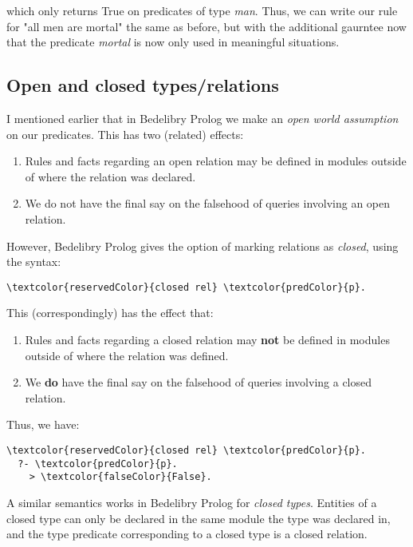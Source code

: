 \documentclass{book}
\begin{document}
which only returns True on predicates of type \textit{man}. Thus, we can write our rule for "all men are mortal" the same as before, but with the additional gaurntee now that the predicate \textit{mortal} is now only used in meaningful situations.

\subsection{Open and closed types/relations}

I mentioned earlier that in Bedelibry Prolog we make an \textit{open world assumption} on our predicates. This has two (related) effects:

\begin{enumerate}
  \item Rules and facts regarding an open relation may be defined in modules outside of where the relation was declared.
  \item We do not have the final say on the falsehood of queries involving an open relation.
\end{enumerate}

\noindent However, Bedelibry Prolog gives the option of marking relations as \textit{closed}, using the syntax:

\begin{Verbatim}[commandchars=\\\{\}]
  \textcolor{reservedColor}{closed rel} \textcolor{predColor}{p}.
\end{Verbatim}

\noindent This (correspondingly) has the effect that:

\begin{enumerate}
  \item Rules and facts regarding a closed relation may \textbf{not} be defined in modules outside of where the relation was defined.
  \item We \textbf{do} have the final say on the falsehood of queries involving a closed relation.
\end{enumerate}

\noindent Thus, we have:

\begin{Verbatim}[commandchars=\\\{\}]
  \textcolor{reservedColor}{closed rel} \textcolor{predColor}{p}.
  ?- \textcolor{predColor}{p}.
    > \textcolor{falseColor}{False}.
\end{Verbatim}

\noindent A similar semantics works in Bedelibry Prolog for \textit{closed types}. Entities of a closed type can only be declared in the same module the type was declared in, and the type predicate corresponding to a closed type is a closed relation.
\end{document}
